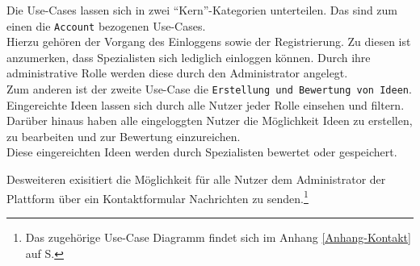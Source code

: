 Die Use-Cases lassen sich in zwei \enquote{Kern}-Kategorien unterteilen.
Das sind zum einen die \texttt{Account} bezogenen Use-Cases.\\
Hierzu gehören der Vorgang des Einloggens sowie der Registrierung.
Zu diesen ist anzumerken, dass Spezialisten sich lediglich einloggen können.
Durch ihre administrative Rolle werden diese durch den Administrator angelegt.\\
Zum anderen ist der zweite Use-Case die \texttt{Erstellung und Bewertung von Ideen}.\\
Eingereichte Ideen lassen sich durch alle Nutzer jeder Rolle einsehen und filtern. Darüber hinaus haben alle eingeloggten Nutzer die Möglichkeit Ideen zu erstellen, zu bearbeiten und zur Bewertung einzureichen.\\
Diese eingereichten Ideen werden durch Spezialisten bewertet oder gespeichert.

Desweiteren exisitiert die Möglichkeit für alle Nutzer dem Administrator der Plattform über ein Kontaktformular Nachrichten zu senden.\footnote{Das zugehörige Use-Case Diagramm findet sich im Anhang \ref{Anhang-Kontakt} auf S.\pageref{Anhang-Kontakt}}